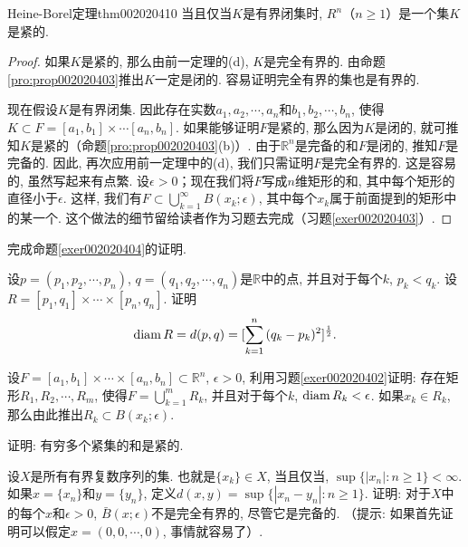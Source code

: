 \begin{theorem}{Heine-Borel定理}{thm002020410}
当且仅当$K$是有界闭集时, $R^{n}$（$n \ge 1$）是一个集$K$是紧的. 
\end{theorem}

\begin{proof}
如果$K$是紧的, 那么由前一定理的(d), $K$是完全有界的. 由命题\ref{pro:prop002020403}推出$K$一定是闭的. 容易证明完全有界的集也是有界的. 

现在假设$K$是有界闭集. 因此存在实数$a_1,a_2,\cdots,a_n$和$b_1,b_2,\cdots,b_n$, 使得$K \subset F = [a_1, b_1] \times \cdots [a_n, b_n]$. 如果能够证明$F$是紧的, 那么因为$K$是闭的, 就可推知$K$是紧的（命题\ref{pro:prop002020403}(b)）. 由于$\mathbb{R}^n$是完备的和$F$是闭的, 推知$F$是完备的. 因此, 再次应用前一定理中的(d), 我们只需证明$F$是完全有界的. 这是容易的, 虽然写起来有点繁. 设$\epsilon > 0$；现在我们将$F$写成$n$维矩形的和, 其中每个矩形的直径小于$\epsilon$. 这样, 我们有$F \subset \bigcup_{k=1}^{\infty}{B(x_k; \epsilon)}$, 其中每个$x_k$属于前面提到的矩形中的某一个. 这个做法的细节留给读者作为习题去完成（习题\ref{exer002020403}）. 
\end{proof}

\begin{exercise}
完成命题\ref{exer002020404}的证明. 
\end{exercise}

\begin{exercise}\label{exer002020402}
设$p = (p_1,p_2,\cdots, p_n)$, $q = (q_1, q_2, \cdots, q_n)$是$\mathbb{R}$中的点, 并且对于每个$k$, $p_k < q_k$. 设$R = [p_1, q_1] \times \cdots \times [p_n,q_n]$. 证明
\[
\operatorname{diam}{R} = d(p, q) = [\sum_{k=1}^{n}{(q_k - p_k)^2}]^{\frac{1}{2}}.
\]
\end{exercise}

\begin{exercise}\label{exer002020403}
设$F = [a_1, b_1] \times \cdots \times [a_n, b_n] \subset \mathbb{R}^n$, $\epsilon > 0$, 利用习题\ref{exer002020402}证明: 存在矩形$R_1, R_2, \cdots, R_m$, 使得$F = \bigcup_{k=1}^{m}{R_k}$, 并且对于每个$k$, $\operatorname{diam}{R_k} < \epsilon$. 如果$x_k \in R_k$, 那么由此推出$R_k \subset B(x_k; \epsilon)$. 
\end{exercise}

\begin{exercise}\label{exer002020404}
证明: 有穷多个紧集的和是紧的. 
\end{exercise}

\begin{exercise}
设$X$是所有有界复数序列的集. 也就是$\{x_k\} \in X$, 当且仅当, $\sup\{|x_n|:n \ge 1\} < \infty$. 如果$x = \{x_n\}$和$y = \{y_n\}$, 定义$d(x, y) = \sup\{|x_n-y_n|: n \ge 1\}$. 证明: 对于$X$中的每个$x$和$\epsilon > 0$, $\bar{B}(x; \epsilon)$不是完全有界的, 尽管它是完备的. （提示: 如果首先证明可以假定$x=(0, 0, \cdots, 0)$, 事情就容易了）. 
\end{exercise}

